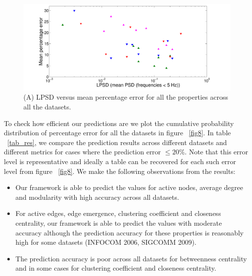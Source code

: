 \begin{figure}
 \begin{center}
 \includegraphics[width=0.89\columnwidth, angle=0]{./texfiles/Chapter_1/fig/psd_pred-eps-converted-to.pdf}
 \caption{\label{k1}(A) LPSD versus mean percentage error for all the properties across all the datasets.}
  \end{center}
 \end{figure}


  
 

To check how efficient our predictions are we plot the cumulative probability distribution of percentage error for all the datasets in figure ~\ref{fig8}. 
In table ~\ref{tab_res}, we compare the prediction results across different datasets and different metrics for cases where the prediction error $\leq20\%$. 
 Note that this error level is representative and ideally a table can be recovered for each such error level from figure ~\ref{fig8}. We make the 
 following observations from the results: 
\begin{itemize}
 \item  Our framework is able to predict the values for active nodes, average degree and modularity with high accuracy across all datasets. 
 \item For active edges, edge emergence, clustering coefficient and closeness centrality, our framework is able to predict the values with moderate accuracy although the 
 prediction accuracy for these properties is reasonably high for some datasets (INFOCOM 2006, SIGCOMM 2009).
 \item The prediction accuracy is poor across all datasets for betweenness centrality and in some cases for clustering coefficient and closeness centrality.
\end{itemize}


